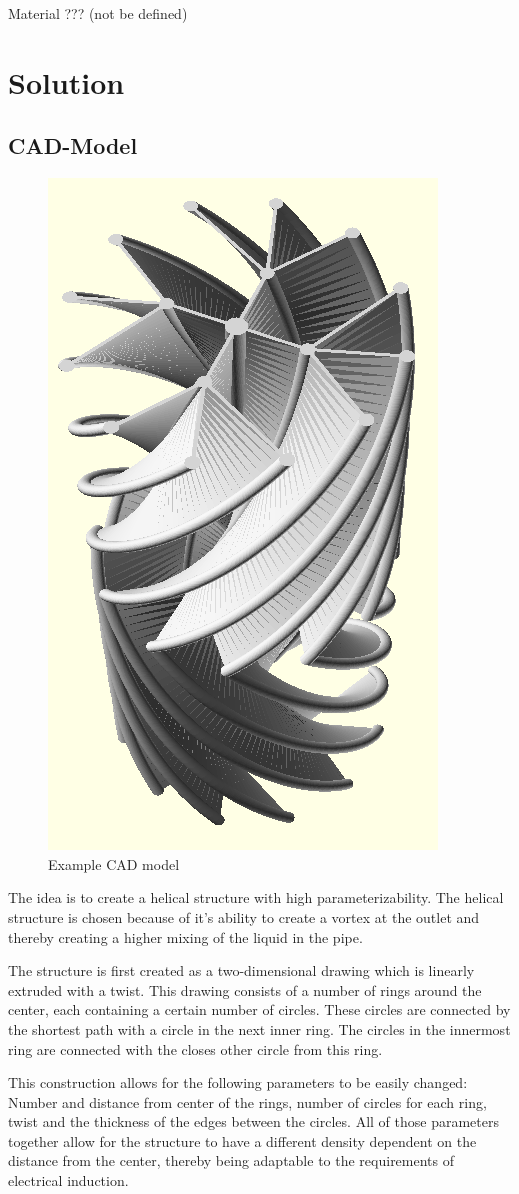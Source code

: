 \documentclass[journal,article,submit,moreauthors,pdftex]{Definitions/mdpi}
\begin{document}
Material ??? (not be defined)


\section{Solution}

\subsection{CAD-Model}

\begin{figure}
\centerline{\includegraphics[height=0.48\textwidth]{./docu_pictures/simple_double_part.png}}
\caption{Example CAD model}
\label{cad-number-of-objects}
\end{figure}

The idea is to create a helical structure with high parameterizability. The helical structure is chosen because of it's ability to create a vortex at the outlet and thereby creating a higher mixing of the liquid in the pipe. 

The structure is first created as a two-dimensional drawing which is linearly extruded with a twist. This drawing consists of a number of rings around the center, each containing a certain number of circles. These circles are connected by the shortest path with a circle in the next inner ring. The circles in the innermost ring are connected with the closes other circle from this ring.

This construction allows for the following parameters to be easily changed: Number and distance from center of the rings, number of circles for each ring, twist and the thickness of the edges between the circles. All of those parameters together allow for the structure to have a different density dependent on the distance from the center, thereby being adaptable to the requirements of electrical induction.
\end{document}
